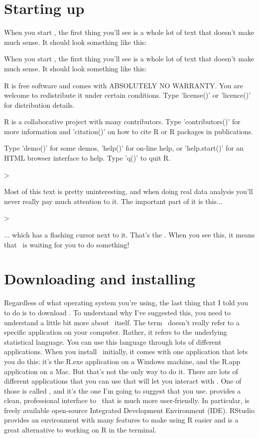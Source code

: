 \section{Starting up \R~\label{sec:startingR}}

When you start \R, the first thing you'll see is a whole lot of text that doesn't make much sense. It should look something like this:

\begin{rblock}
	When you start \R, the first thing you'll see is a whole lot of text that doesn't make much sense. It should look something like this:
	
	R is free software and comes with ABSOLUTELY NO WARRANTY.
	You are welcome to redistribute it under certain conditions.
	Type 'license()' or 'licence()' for distribution details.
	
	R is a collaborative project with many contributors.
	Type 'contributors()' for more information and
	'citation()' on how to cite R or R packages in publications.
	
	Type 'demo()' for some demos, 'help()' for on-line help, or
	'help.start()' for an HTML browser interface to help.
	Type 'q()' to quit R.
	
	> 
\end{rblock}
Most of this text is pretty uninteresting, and when doing real data analysis you'll never really pay much attention to it. The important part of it is this...
\begin{rblock}
	> 
\end{rblock}
... which has a flashing cursor next to it. That's the . When you see this, it means that \R\ is waiting for you to do something! 

\section{Downloading and installing  \Rstudio}

Regardless of what operating system you're using, the last thing that I told you to do is to download \Rstudio. To understand why I've suggested this,  you need to understand a little bit more about \R\ itself. The term \R\ doesn't really refer to a specific application on your computer. Rather, it refers to the underlying statistical language. You can use this language through lots of different applications. When you install \R\ initially, it comes with one application that lets you do this: it's the R.exe application on a Windows machine, and the R.app application on a Mac. But that's not the only way to do it. There are lots of different applications that you can use that will let you interact with \R. One of those is called \Rstudio, and it's the one I'm going to suggest that you use. \Rstudio provides a clean, professional interface to \R\ that is much more user-friendly. 
In particular, \Rstudio is freely available open-source Integrated Development Environment (IDE). RStudio provides an environment with many features to make using R easier and is a great alternative to working on R in the terminal. 


